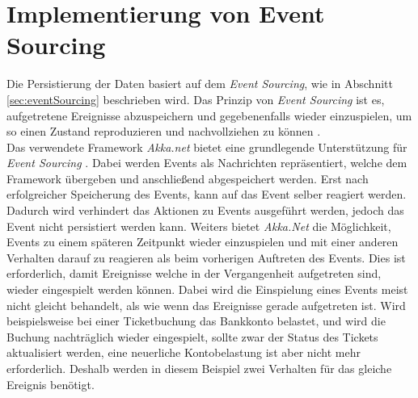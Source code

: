 \section{Implementierung von Event Sourcing}
\label{sec:implementation:eventSouring}
Die Persistierung der Daten basiert auf dem \textit{Event Sourcing}, wie in Abschnitt \ref{sec:eventSourcing} beschrieben wird. Das Prinzip von \textit{Event Sourcing} ist es, aufgetretene Ereignisse abzuspeichern und gegebenenfalls wieder einzuspielen, um so einen Zustand reproduzieren und nachvollziehen zu können \citep{betts2013CQRSEventSourcing}. \\
Das verwendete Framework \textit{Akka.net} bietet eine grundlegende Unterstützung für \textit{Event Sourcing} \citep{Akka.netCommunityAkka.NETDocumentation}. Dabei werden Events als Nachrichten repräsentiert, welche dem Framework übergeben und anschließend abgespeichert werden. 
Erst nach erfolgreicher Speicherung des Events, kann auf das Event selber reagiert werden. Dadurch wird verhindert das Aktionen zu Events ausgeführt werden, jedoch das Event nicht persistiert werden kann. Weiters bietet \textit{Akka.Net} die Möglichkeit, Events zu einem späteren Zeitpunkt wieder einzuspielen und mit einer anderen Verhalten darauf zu reagieren als beim vorherigen Auftreten des Events. Dies ist erforderlich, damit Ereignisse welche in der Vergangenheit aufgetreten sind,  wieder eingespielt werden können. Dabei wird die Einspielung eines Events meist nicht gleicht behandelt, als wie wenn das Ereignisse gerade aufgetreten ist. Wird beispielsweise bei einer Ticketbuchung das Bankkonto belastet, und wird die Buchung nachträglich wieder eingespielt, sollte zwar der Status des Tickets aktualisiert werden, eine neuerliche Kontobelastung ist aber nicht mehr erforderlich. Deshalb werden in diesem Beispiel zwei Verhalten für das gleiche Ereignis benötigt.
